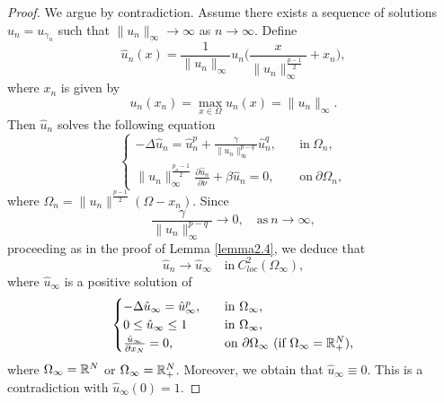 \documentclass[12pt,reqno]{amsart}
\numberwithin{equation}{section}
\theoremstyle{definition}
\def\R{{\mathfrak R}}
\def\R{\Bbb R}
\begin{document}
\begin{proof}
We argue by contradiction. Assume there exists a sequence of solutions $u_n=u_{\gamma_n}$ such that $\|u_n\|_\infty\to\infty$ as $n\to\infty$. Define 
$$
\hat{u}_{n}(x)=\frac{1}{\|u_{n}\|_\infty}u_n\Big(\frac{x}{\|u_{n}\|_\infty^{\frac{p-1}{2}}}+x_{n}\Big),
$$
where $x_n$ is given by
$$
u_n(x_n)=\max_{x\in\Omega}u_n(x)=\|u_n\|_\infty.
$$
Then $\hat{u}_n$ solves the following equation 
\begin{equation*}
\begin{cases}
-\Delta \hat{u}_n=\hat{u}_n^{p}+\frac{\gamma}{\|u_n\|_\infty^{p-q}}\hat{u}_n^q,\quad &\text{in}\ \Omega_n,\\
\|u_n\|_\infty^{\frac{p_n-1}{2}}\frac{\partial \hat{u}_n}{\partial \nu}+\beta \hat{u}_n=0, &\text{on}\ \partial\Omega_n,
\end{cases}
\end{equation*}
where $\Omega_n=\|u_n\|^{\frac{p-1}{2}}(\Omega-x_n)$. Since 
$$
\frac{\gamma}{\|u_n\|_\infty^{p-q}}\to 0,\quad \text{as}\ n\to\infty,
$$
proceeding as in the proof of Lemma \ref{lemma2.4}, we deduce that 
$$
\hat{u}_n\to \hat{u}_\infty\quad \text{in}\  C^2_{loc}(\Omega_\infty),
$$ 
where $\hat{u}_\infty$ is a positive solution of 
\begin{equation}
\begin{cases}
-\Delta \hat{u}_\infty=\hat{u}_\infty^{p},\quad &\text{in}\ \Omega_\infty,\\
0\le\hat{u}_\infty\le 1 &\text{in}\ \Omega_\infty,\\
\frac{\hat{u}_\infty}{\partial x_N}=0, &\text{on}\ \partial\Omega_\infty \ (\text{if}\ \Omega_\infty=\R^N_+),
\end{cases}
\end{equation}
where $\Omega_\infty=\R^N$ or $\Omega_\infty=\R^N_+$. Moreover, we obtain that $\hat{u}_\infty\equiv 0$. This is a contradiction with $\hat{u}_\infty(0)=1$.
\end{proof}
\end{document}
